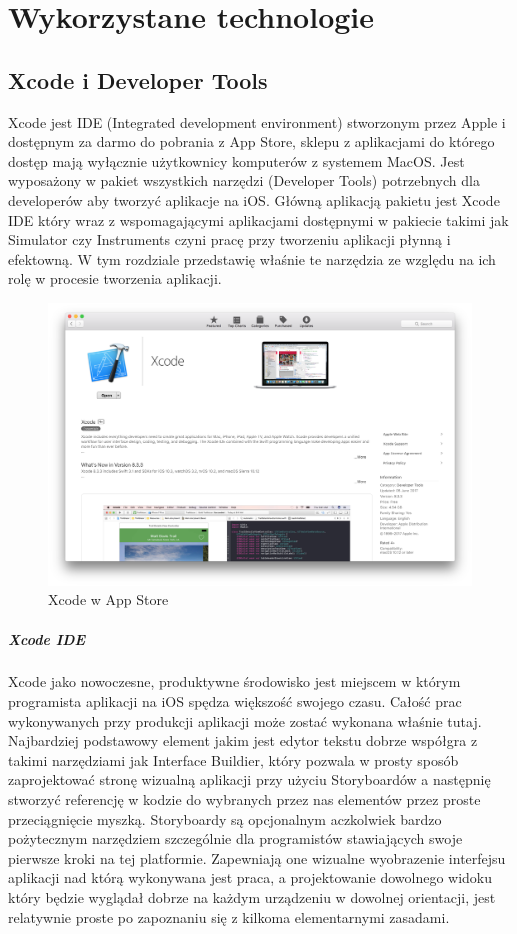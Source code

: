 \chapter{Wykorzystane technologie}

\section{Xcode i Developer Tools}
Xcode jest IDE (Integrated development environment) stworzonym przez Apple i dostępnym za darmo do pobrania z App Store, sklepu
z aplikacjami do którego dostęp mają wyłącznie użytkownicy komputerów z systemem MacOS. Jest wyposażony w pakiet wszystkich narzędzi
(Developer Tools) potrzebnych dla developerów aby tworzyć aplikacje na iOS. Główną aplikacją pakietu jest Xcode IDE który wraz z
wspomagającymi aplikacjami dostępnymi w pakiecie takimi jak Simulator czy Instruments czyni pracę przy tworzeniu aplikacji płynną
i efektowną. W tym rozdziale przedstawię właśnie te narzędzia ze względu na ich rolę w procesie tworzenia aplikacji.

\begin{figure}[ht!]
  \centering
  \includegraphics[width=120mm]{images/chapter-2-image-1-appstore.png}
  \caption{Xcode w App Store}
  \label{overflow}
\end{figure}

\paragraph{Xcode IDE}
Xcode jako nowoczesne, produktywne środowisko jest miejscem w którym programista aplikacji na iOS spędza większość swojego
czasu. Całość prac wykonywanych przy produkcji aplikacji może zostać wykonana właśnie tutaj. Najbardziej podstawowy element jakim
jest edytor tekstu dobrze współgra z takimi narzędziami jak Interface Buildier, który pozwala w prosty sposób zaprojektować stronę
wizualną aplikacji przy użyciu Storyboardów a następnię stworzyć referencję w kodzie do wybranych przez nas elementów przez proste
przeciągnięcie myszką. Storyboardy są opcjonalnym aczkolwiek bardzo pożytecznym narzędziem szczególnie dla programistów stawiających
swoje pierwsze kroki na tej platformie. Zapewniają one wizualne wyobrazenie interfejsu aplikacji nad którą wykonywana jest praca,
a projektowanie dowolnego widoku który będzie wyglądał dobrze na każdym urządzeniu w dowolnej orientacji, jest relatywnie proste po
zapoznaniu się z kilkoma elementarnymi zasadami.

